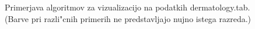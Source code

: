 \documentclass[a4paper]{article}
\begin{document}
	\begin{figure}[H]
	\begin{center}
	\end{center}
	\caption{Primerjava algoritmov za vizualizacijo na podatkih dermatology.tab. (Barve pri razli"cnih primerih ne predstavljajo nujno istega razreda.)}
	\label{f-derm}
	\end{figure}
	
\end{document}
